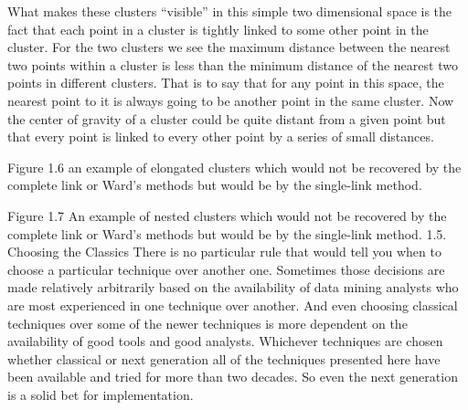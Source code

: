 What makes these clusters “visible” in this simple two dimensional space is the fact that each point in a cluster is tightly linked to some other point in the cluster.  For the two clusters we see the maximum distance between the nearest two points within a cluster is less than the minimum distance of the nearest two points in different clusters.  That is to say that for any point in this space, the nearest point to it is always going to be another point in the same cluster.  Now the center of gravity of a cluster could be quite distant from a given point but that every point is linked to every other point by a series of small distances.

Figure 1.6  an example of elongated clusters which would not be recovered by the complete link or Ward's methods but would be by the single-link method.

Figure 1.7  An example of nested clusters which would not be recovered by the complete link or Ward's methods but would be by the single-link method.
1.5. Choosing the Classics
There is no particular rule that would tell you when to choose a particular technique over another one.  Sometimes those decisions are made relatively arbitrarily based on the availability of data mining analysts who are most experienced in one technique over another.   And even choosing classical techniques over some of the newer techniques is more dependent on the availability of good tools and good analysts.  Whichever techniques are chosen whether classical or next generation all of the techniques presented here have been available and tried for more than two decades.  So even the next generation is a solid bet for implementation.

